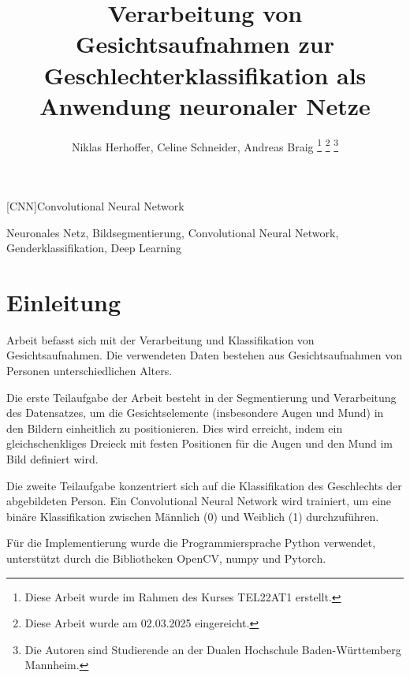 \documentclass[journal,twoside,web]{ieeecolor}
\begin{document}
\begin{acronym}
    [CNN]{Convolutional Neural Network} 
\end{acronym}

\title{Verarbeitung von Gesichtsaufnahmen zur Geschlechterklassifikation als Anwendung neuronaler Netze}
\author{Niklas Herhoffer, Celine Schneider, Andreas Braig
\thanks{Diese Arbeit wurde im Rahmen des Kurses TEL22AT1 erstellt.}
\thanks{Diese Arbeit wurde am 02.03.2025 eingereicht.}  
\thanks{Die Autoren sind Studierende an der Dualen Hochschule Baden-Württemberg Mannheim.}}

\maketitle

\begin{abstract}
    
\end{abstract}


\begin{IEEEkeywords}
    Neuronales Netz, Bildsegmentierung, Convolutional Neural Network, Genderklassifikation, Deep Learning
\end{IEEEkeywords}

\section{Einleitung}
\label{sec:introduction}
 Arbeit befasst sich mit der Verarbeitung und Klassifikation von Gesichtsaufnahmen. Die verwendeten Daten bestehen aus Gesichtsaufnahmen von Personen unterschiedlichen Alters. 

Die erste Teilaufgabe der Arbeit besteht in der Segmentierung und Verarbeitung des Datensatzes, um die Gesichtselemente (insbesondere Augen und Mund) in den Bildern einheitlich zu positionieren. Dies wird erreicht, indem ein gleichschenkliges Dreieck mit festen Positionen für die Augen und den Mund im Bild definiert wird. 

Die zweite Teilaufgabe konzentriert sich auf die Klassifikation des Geschlechts der abgebildeten Person. Ein Convolutional Neural Network wird trainiert, um eine binäre Klassifikation zwischen Männlich (0) und Weiblich (1) durchzuführen.

Für die Implementierung wurde die Programmiersprache Python verwendet, unterstützt durch die Bibliotheken OpenCV, numpy und Pytorch.
\end{document}
